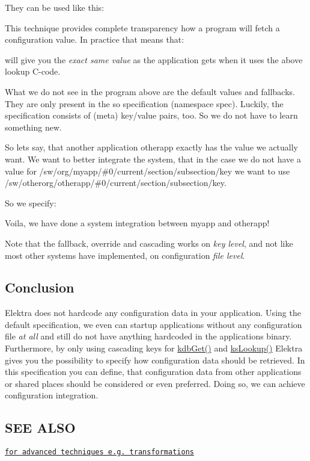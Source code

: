 They can be used like this\+: 


This technique provides complete transparency how a program will fetch a configuration value. In practice that means that\+: 


will give you the {\itshape exact same value} as the application gets when it uses the above lookup C-\/code.

What we do not see in the program above are the default values and fallbacks. They are only present in the so specification (namespace {\ttfamily spec}). Luckily, the specification consists of (meta) key/value pairs, too. So we do not have to learn something new.

So lets say, that another application {\ttfamily otherapp} exactly has the value we actually want. We want to better integrate the system, that in the case we do not have a value for {\ttfamily /sw/org/myapp/\#0/current/section/subsection/key} we want to use {\ttfamily /sw/otherorg/otherapp/\#0/current/section/subsection/key}.

So we specify\+: 


Voila, we have done a system integration between {\ttfamily myapp} and {\ttfamily otherapp}!

Note that the fallback, override and cascading works on {\itshape key level}, and not like most other systems have implemented, on configuration {\itshape file level}.

\subsection*{Conclusion}

Elektra does not hardcode any configuration data in your application. Using the {\ttfamily default} specification, we even can startup applications without any configuration file {\itshape at all} and still do not have anything hardcoded in the applications binary. Furthermore, by only using cascading keys for {\ttfamily \hyperlink{group__kdb_ga28e385fd9cb7ccfe0b2f1ed2f62453a1}{kdb\+Get()}} and {\ttfamily \hyperlink{group__keyset_gaa34fc43a081e6b01e4120daa6c112004}{ks\+Lookup()}} Elektra gives you the possibility to specify how configuration data should be retrieved. In this specification you can define, that configuration data from other applications or shared places should be considered or even preferred. Doing so, we can achieve configuration integration.

\subsection*{S\+E\+E A\+L\+S\+O}


\begin{DoxyItemize}
\item \href{http://www.libelektra.org/ftp/papers/kps2015sharing.pdf}{\tt for advanced techniques e.\+g. transformations} 
\end{DoxyItemize}